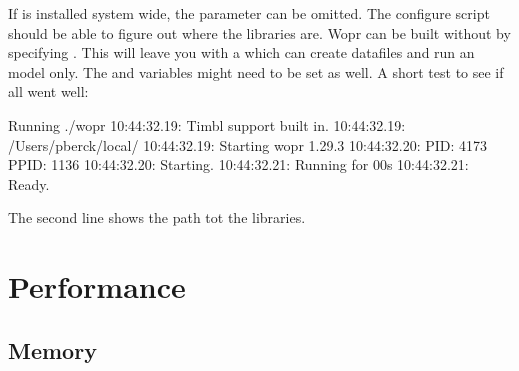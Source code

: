 \documentclass[a4paper,10pt,twoside]{report}
\begin{document}
If \Timbl{} is installed system wide, the  parameter
can be omitted. The configure script should be able to figure out
where the libraries are. Wopr can be built without \Timbl{} by specifying
. This will leave you with a \wopr{} which can
create datafiles and run an \ngram{} model only.
The  and  variables might need to be
set as well. A short test to see if all went well:

\begin{bash}{Running \wopr{}}
./wopr
10:44:32.19: Timbl support built in.
10:44:32.19: /Users/pberck/local/
10:44:32.19: Starting wopr 1.29.3
10:44:32.20: PID:   4173 PPID:   1136
10:44:32.20: Starting.
10:44:32.21: Running for 00s
10:44:32.21: Ready.
\end{bash}

The second line shows the path tot the \Timbl{} libraries.

\chapter{Performance}

\section{Memory}

\end{document}
